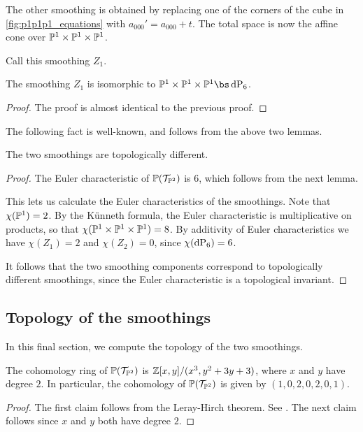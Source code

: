 The other smoothing is obtained by replacing one of the corners of the cube in \cref{fig:p1p1p1_equations} with $a_{000}'=a_{000}+t$. The total space is now the affine cone over $\P^1 \times \P^1 \times \P^1$. 

Call this smoothing $Z_1.$

\begin{lemma}
The smoothing $Z_1$ is isomorphic to $\P^1 \times \P^1 \times \P^1 \bs \dP6$.
\end{lemma}
\begin{proof}
The proof is almost identical to the previous proof.
\end{proof}

The following fact is well-known, and follows from the above two lemmas.

\begin{proposition}
The two smoothings are topologically different.
\end{proposition}
\begin{proof}
The Euler characteristic of $\P(\mathcal T_{\P^2})$ is $6$, which follows from the next lemma.

This lets us calculate the Euler characteristics of the smoothings. Note that $\chi(\P^1)=2$. By the Künneth formula, the Euler characteristic is multiplicative on products, so that $\chi(\P^1 \times \P^1 \times \P^1)=8$. By additivity of Euler characteristics we have $\chi(Z_1)=2$ and $\chi(Z_2)=0$, since $\chi(\dP6)=6$.

It follows that the two smoothing components correspond to topologically different smoothings, since the Euler characteristic is a topological invariant.
\end{proof}

\subsection{Topology of the smoothings}

In this final section, we compute the topology of the two smoothings.

\begin{lemma}
The cohomology ring of $\P(\mathcal T_{\P^2})$ is $\Z[x,y]/(x^3,y^2+3y+3)$, where $x$ and $y$ have degree $2$. In particular, the cohomology of $\P(\mathcal T_{\P^2})$ is given by $(1,0,2,0,2,0,1)$.
\end{lemma}
\begin{proof}
The first claim follows from the Leray-Hirch theorem. See \cite[page 270]{bott_tu}. The next claim follows since $x$ and $y$ both have degree $2$.
\end{proof}

